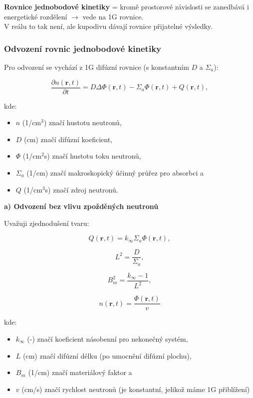 \textbf{Rovnice jednobodové kinetiky} = kromě prostorové závislosti se zanedbává i energetické rozdělení $\rightarrow$ vede na 1G rovnice.\\

V reálu to tak není, ale kupodivu dávají rovnice přijatelné výsledky.

\subsubsection{Odvození rovnic jednobodové kinetiky}

Pro odvození se vychází z 1G difúzní rovnice (s konstantním $D$ a $\Sigma_a$):

\begin{equation}
  \boxed{
  \dfrac{\partial n(\textbf{r}, t)}{\partial t} = D \Delta \Phi (\textbf{r}, t) - \Sigma_a \Phi (\textbf{r}, t) + Q (\textbf{r}, t),
  \label{difuzka}}
\end{equation}

kde:

\begin{itemize}
  \item $n$ (1/cm$^3$) značí hustotu neutronů,
  \item $D$ (cm) značí difúzní koeficient,
  \item $\Phi$ (1/cm$^2$s) značí hustotu toku neutronů,
  \item $\Sigma_a$ (1/cm) značí makroskopický účinný průřez pro absorbci a
  \item $Q$ (1/cm$^3$s) značí zdroj neutronů.
\end{itemize}

\textbf{a) Odvození bez vlivu zpožděných neutronů}

Uvažuji zjednodušení tvaru:

$$ Q (\textbf{r}, t) = k_\infty \Sigma_a \Phi (\textbf{r}, t), $$

$$ L^2 = \dfrac{D}{\Sigma_a}, $$

$$ B_m^2 = \dfrac{k_\infty - 1}{L^2}, $$

$$ n(\textbf{r}, t) = \dfrac{\Phi (\textbf{r}, t)}{v}$$

kde:

\begin{itemize}
  \item $k_\infty$ (-) značí koeficient násobenní pro nekonečný systém,
  \item $L$ (cm) značí difúzní délku (po umocnění difúzní plochu),
  \item $B_m$ (1/cm) značí materiálový faktor a
  \item $v$ (cm/s) značí rychlost neutronů (je konstantní, jelikož máme 1G přiblížení)
\end{itemize}

